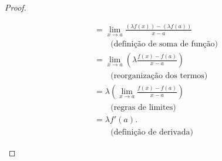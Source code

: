 \begin{proof}
\begin{enumerate}
\begin{align*}
					&=\lim_{x\to a}\frac{\left(\lambda f(x)\right)-\left(\lambda f(a)\right)}{x-a}\\
					&\qquad\text{(definição de soma de função)}\\
					&=\lim_{x\to a}\left(\lambda \frac{f(x)-f(a)}{x-a}\right)\\
					&\qquad\text{(reorganização dos termos)}\\
					&=\lambda\left(\lim_{x\to a}\frac{f(x)-f(a)}{x-a}\right)\\
					&\qquad\text{(regras de limites)}\\
					&=\lambda f'(a).\\
					&\qquad\text{(definição de derivada)}
			\end{align*}
	\end{enumerate}
\end{proof}